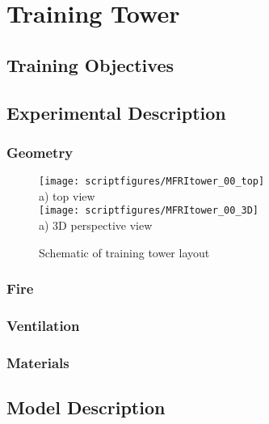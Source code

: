 \chapter{Training Tower}

\section{Training Objectives}

\section{Experimental Description}
\subsection{Geometry}


\begin{figure}[\figoptions]
\begin{center}
\texttt{[image: scriptfigures/MFRItower\_00\_top]}\\
a) top view\\
\texttt{[image: scriptfigures/MFRItower\_00\_3D]}\\
a) 3D perspective view\\
\end{center}
\caption {Schematic of training tower layout}
\label{figflashoverplan}%
\end{figure}
\subsection{Fire}

\subsection{Ventilation}

\subsection{Materials}

\section{Model Description}

